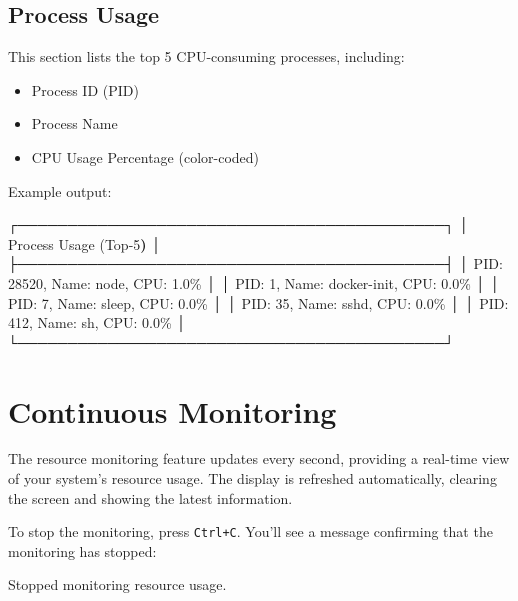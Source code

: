\documentclass[
  letterpaper,
  DIV=11,
  numbers=noendperiod]{scrreprt}
\newenvironment{Shaded}{\begin{snugshade}}{\end{snugshade}}
\newcommand{\ErrorTok}[1]{\textcolor[rgb]{0.68,0.00,0.00}{#1}}
\newcommand{\ExtensionTok}[1]{\textcolor[rgb]{0.00,0.23,0.31}{#1}}
\newcommand{\KeywordTok}[1]{\textcolor[rgb]{0.00,0.23,0.31}{\textbf{#1}}}
\newcommand{\NormalTok}[1]{\textcolor[rgb]{0.00,0.23,0.31}{#1}}
\providecommand{\tightlist}{%
  \setlength{\itemsep}{0pt}\setlength{\parskip}{0pt}}\usepackage{longtable,booktabs,array}
\begin{document}
\subsection*{Process Usage}\label{process-usage}

This section lists the top 5 CPU-consuming processes, including:

\begin{itemize}
\tightlist
\item
  Process ID (PID)
\item
  Process Name
\item
  CPU Usage Percentage (color-coded)
\end{itemize}

Example output:

\begin{Shaded}
\begin{Highlighting}[]
\ExtensionTok{┌───────────────────────────────────────────┐}
\ExtensionTok{│}\NormalTok{ Process Usage }\ErrorTok{(}\ExtensionTok{Top{-}5}\KeywordTok{)}                     \ExtensionTok{│}
\ExtensionTok{├───────────────────────────────────────────┤}
\ExtensionTok{│}\NormalTok{ PID: 28520, Name: node, CPU: 1.0\%         │}
\ExtensionTok{│}\NormalTok{ PID: 1, Name: docker{-}init, CPU: 0.0\%      │}
\ExtensionTok{│}\NormalTok{ PID: 7, Name: sleep, CPU: 0.0\%            │}
\ExtensionTok{│}\NormalTok{ PID: 35, Name: sshd, CPU: 0.0\%            │}
\ExtensionTok{│}\NormalTok{ PID: 412, Name: sh, CPU: 0.0\%             │}
\ExtensionTok{└───────────────────────────────────────────┘}
\end{Highlighting}
\end{Shaded}

\section*{Continuous Monitoring}\label{continuous-monitoring}


The resource monitoring feature updates every second, providing a
real-time view of your system's resource usage. The display is refreshed
automatically, clearing the screen and showing the latest information.

To stop the monitoring, press \texttt{Ctrl+C}. You'll see a message
confirming that the monitoring has stopped:

\begin{Shaded}
\begin{Highlighting}[]
\ExtensionTok{Stopped}\NormalTok{ monitoring resource usage.}
\end{Highlighting}
\end{Shaded}
\end{document}
